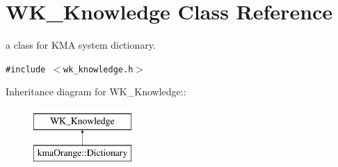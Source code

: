 \hypertarget{classWK__Knowledge}{
\section{WK\_\-Knowledge Class Reference}
\label{classWK__Knowledge}
}
a class for KMA system dictionary.  


{\tt \#include $<$wk\_\-knowledge.h$>$}

Inheritance diagram for WK\_\-Knowledge::\begin{figure}[H]
\begin{center}
\leavevmode
\includegraphics[height=2cm]{classWK__Knowledge}
\end{center}
\end{figure}
